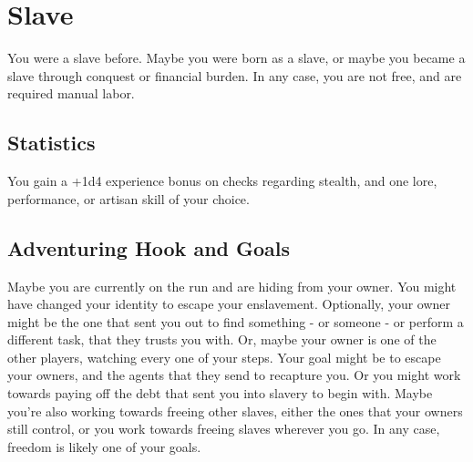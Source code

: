 \section{Slave}\label{background:slave}
You were a slave before. 
Maybe you were born as a slave, or maybe you became a slave through conquest or financial burden.
In any case, you are not free, and are required manual labor.

\subsection{Statistics}
You gain a +1d4 experience bonus on checks regarding stealth, and one lore, performance, or artisan skill of your choice.

\subsection{Adventuring Hook and Goals}
Maybe you are currently on the run and are hiding from your owner.
You might have changed your identity to escape your enslavement.
Optionally, your owner might be the one that sent you out to find something -  or someone - or perform a different task, that they trusts you with.
Or, maybe your owner is one of the other players, watching every one of your steps.
Your goal might be to escape your owners, and the agents that they send to recapture you.
Or you might work towards paying off the debt that sent you into slavery to begin with.
Maybe you're also working towards freeing other slaves, either the ones that your owners still control, or you work towards freeing slaves wherever you go.
In any case, freedom is likely one of your goals.